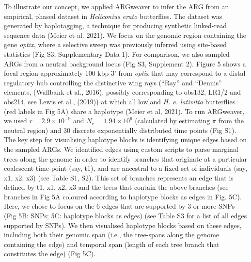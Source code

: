 \documentclass[twocolumn]{bmcart}%
\begin{document}
To illustrate our concept, we applied ARGweaver to infer the ARG from an empirical, phased dataset in \textit{Heliconius erato} butterflies. The dataset was generated by haplotagging, a technique for producing synthetic linked-read sequence data (Meier et al. 2021). We focus on the genomic region containing the gene \textit{optix}, where a selective sweep was previously inferred using site-based statistics (Fig S3, Supplementary Data 1). For comparison, we also sampled ARGs from a neutral background locus (Fig S3, Supplement 2). Figure 5 shows a focal region approximately 100 kbp 3’ from \textit{optix} that may correspond to a distal regulatory hub controlling the distinctive wing rays (“Ray” and “Dennis” elements, (Wallbank et al., 2016), possibly corresponding to obs132, LR1/2 and obs214, see Lewis et al., (2019)) at which all lowland \textit{H. e. lativitta} butterflies (red labels in Fig 5A) share a haplotype (Meier et al, 2021). To run ARGweaver, we used $r = 2.9\times10^{-9}$ and $N_e = 1.94 \times 10^{6}$ (calculated by estimating $\pi$ from the neutral region) and 30 discrete exponentially distributed time points (Fig S1). The key step for visualising haplotype blocks is identifying unique edges based on the sampled ARGs. We identified edges using custom scripts to parse marginal trees along the genome in order to identify branches
 that originate at a particular coalescent time-point (say, t1), and are ancestral to a fixed set of individuals (say, x1, x2, x3) (see Table S1, S2). This set of branches represents an edge that is defined by {t1}, {x1, x2, x3} and the trees that contain the above branches (see branches in Fig 5A coloured according to haplotype blocks as edges in Fig. 5C). Here, we chose to focus on the 6 edges that are supported by 3 or more SNPs (Fig 5B: SNPs; 5C: haplotype blocks as edges) (see Table S3 for a list of all edges supported by SNPs). We then visualised haplotype blocks based on these edges, including both their genomic span (i.e., the tree-spans along the genome containing the edge) and temporal span (length of each tree branch that constitutes the edge) (Fig 5C). 
\end{document}
